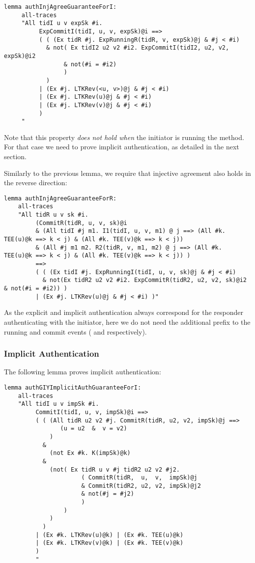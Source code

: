 \begin{lstlisting}
lemma authInjAgreeGuaranteeForI:
     all-traces
     "All tidI u v expSk #i.
          ExpCommitI(tidI, u, v, expSk)@i ==>
          ( ( (Ex tidR #j. ExpRunningR(tidR, v, expSk)@j & #j < #i)
            & not( Ex tidI2 u2 v2 #i2. ExpCommitI(tidI2, u2, v2, expSk)@i2
                 & not(#i = #i2)
                 )
            )
          | (Ex #j. LTKRev(<u, v>)@j & #j < #i)
          | (Ex #j. LTKRev(u)@j & #j < #i)
          | (Ex #j. LTKRev(v)@j & #j < #i)
          )
     "
\end{lstlisting}

Note that this property \emph{does not hold when} the initiator is
running the \mStat{} method.
%
For that case we need to prove implicit authentication, as detailed in
the next section.

Similarly to the previous lemma, we require that injective agreement also holds
in the reverse direction:

\begin{lstlisting}
lemma authInjAgreeGuaranteeForR:
    all-traces
    "All tidR u v sk #i.
         (CommitR(tidR, u, v, sk)@i
	     & (All tidI #j m1. I1(tidI, u, v, m1) @ j ==> (All #k. TEE(u)@k ==> k < j) & (All #k. TEE(v)@k ==> k < j))
         & (All #j m1 m2. R2(tidR, v, m1, m2) @ j ==> (All #k. TEE(u)@k ==> k < j) & (All #k. TEE(v)@k ==> k < j)) )
         ==>
         ( ( (Ex tidI #j. ExpRunningI(tidI, u, v, sk)@j & #j < #i)
           & not(Ex tidR2 u2 v2 #i2. ExpCommitR(tidR2, u2, v2, sk)@i2 & not(#i = #i2)) )
         | (Ex #j. LTKRev(u)@j & #j < #i) )"
\end{lstlisting}

As the explicit and implicit authentication always correspond for the
responder authenticating with the initiator, here we do not need the
additional  prefix to the running and commit events
( and  respectively).

 
\subsubsection{Implicit Authentication}

The following lemma proves implicit authentication:
\begin{lstlisting}
lemma authGIYImplicitAuthGuaranteeForI:
    all-traces
    "All tidI u v impSk #i.
         CommitI(tidI, u, v, impSk)@i ==>
         ( ( (All tidR u2 v2 #j. CommitR(tidR, u2, v2, impSk)@j ==>
                (u = u2  &  v = v2)
             )
           &
             (not Ex #k. K(impSk)@k)
           &
             (not( Ex tidR u v #j tidR2 u2 v2 #j2.
                      ( CommitR(tidR,  u,  v,  impSk)@j
                      & CommitR(tidR2, u2, v2, impSk)@j2
                      & not(#j = #j2)
                      )
                 )
             )
           )
         | (Ex #k. LTKRev(u)@k) | (Ex #k. TEE(u)@k)
         | (Ex #k. LTKRev(v)@k) | (Ex #k. TEE(v)@k)
         )
         "
\end{lstlisting}

